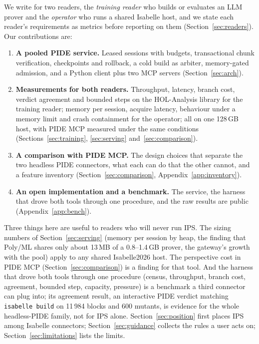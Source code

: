 \documentclass[11pt]{article}
\newcommand{\code}[1]{\colorbox{gray!12}{\texttt{\vphantom{Ag}#1}}}
\begin{document}
We write for two readers, the \emph{training reader} who builds or
evaluates an LLM prover and the \emph{operator} who runs a shared Isabelle
host, and we state each reader's requirements as metrics before reporting
on them (Section~\ref{sec:readers}). Our contributions are:
\begin{enumerate}
  \item \textbf{A pooled PIDE service.} Leased sessions with budgets,
    transactional chunk verification, checkpoints and rollback, a cold
    build as arbiter, memory-gated admission, and a Python client plus two
    MCP servers (Section~\ref{sec:arch}).
  \item \textbf{Measurements for both readers.} Throughput, latency,
    branch cost, verdict agreement and bounded steps on the HOL-Analysis
    library for the training reader; memory per session, acquire latency,
    behaviour under a memory limit and crash containment for the operator;
    all on one 128\,GB host, with PIDE MCP measured under the same
    conditions (Sections~\ref{sec:training}, \ref{sec:serving}
    and~\ref{sec:comparison}).
  \item \textbf{A comparison with PIDE MCP.} The design choices that
    separate the two headless PIDE connectors, what each can do that the
    other cannot, and a feature inventory (Section~\ref{sec:comparison},
    Appendix~\ref{app:inventory}).
  \item \textbf{An open implementation and a benchmark.} The service,
    the harness that drove both tools through one procedure, and the raw
    results are public (Appendix~\ref{app:bench}).
\end{enumerate}
Three things here are useful to readers who will never run IPS. The
sizing numbers of Section~\ref{sec:serving} (memory per session by heap,
the finding that Poly/ML shares only about 13\,MB of a 0.8--1.4\,GB
prover, the gateway's growth with the pool) apply to any shared
Isabelle2026 host. The perspective cost in PIDE MCP
(Section~\ref{sec:comparison}) is a finding for that tool. And the
harness that drove both tools through one procedure (census, throughput,
branch cost, agreement, bounded step, capacity, pressure) is a benchmark a
third connector can plug into; its agreement result, an interactive PIDE
verdict matching \code{isabelle build} on 11\,984 blocks and 600
mutants, is evidence for the whole headless-PIDE family, not for IPS
alone. Section~\ref{sec:position} first places IPS among Isabelle
connectors; Section~\ref{sec:guidance} collects the rules a user acts on;
Section~\ref{sec:limitations} lists the limits.
\end{document}
